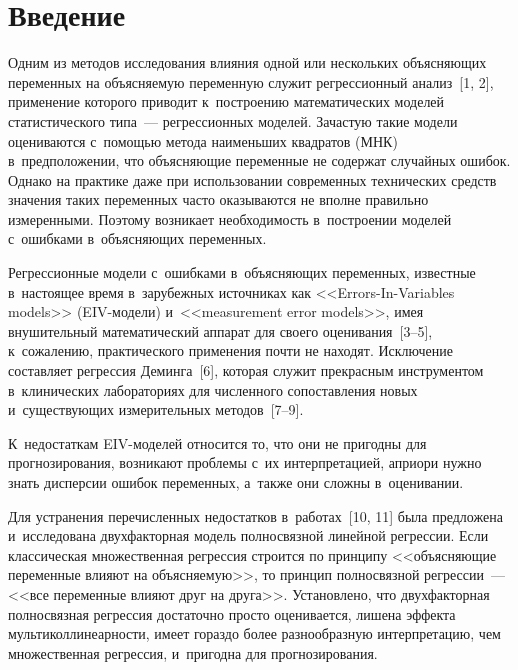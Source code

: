 \thispagestyle{headings}

\begin{multicols}{2}

\label{st\stat}
     
     
\section{Введение}

    Одним из методов исследования влияния одной или нескольких 
объясняющих переменных на объясняемую переменную служит регрессионный 
анализ~[1, 2], применение которого приводит к~построению математических 
моделей статистического типа~--- регрессионных моделей. За\-час\-тую такие\linebreak 
модели оцениваются с~помощью метода наименьших квадратов (МНК) 
в~предположении, что объясняющие переменные не содержат случайных 
ошибок. Однако на практике даже при использовании современных 
технических средств значения таких переменных часто оказываются не вполне 
правильно измеренными. Поэтому возникает необходимость в~построении 
моделей с~ошибками в~объясняющих переменных.
    
    Регрессионные модели с~ошибками в~объясняющих переменных, известные 
в~настоящее время в~зарубежных источниках как <<Errors-In-Variables models>>  
(EIV-модели) и~<<measurement error models>>, имея внушительный 
математический аппарат для своего оценивания~[3--5], к~сожалению, 
практического применения почти не находят. Исключение составляет регрессия 
Деминга~[6], которая служит прекрасным инструментом в~клинических 
лабораториях для численного сопоставления новых и~существующих 
измерительных методов~[7--9]. 

К~недостаткам EIV-моделей относится то, что 
они не пригодны для прогнозирования, возникают проблемы с~их 
интерпретацией, априори нужно знать дисперсии ошибок переменных, а~также 
они сложны в~оценивании. 

Для устранения перечисленных недостатков 
в~работах~[10, 11] была предложена и~исследована двухфакторная модель 
полносвязной линейной регрессии. Если классическая множественная 
регрессия строится по принципу <<объясняющие переменные влияют на 
объясняемую>>, то принцип полносвязной регрессии~--- <<все переменные 
влияют друг на друга>>. Уста\-нов\-ле\-но, что двухфакторная полносвязная 
регрессия достаточно просто оценивается, лишена эффекта 
мультиколлинеарности, имеет гораздо более разнообразную интерпретацию, 
чем множественная регрессия, и~пригодна для прогнозирования. 


\end{multicols}
